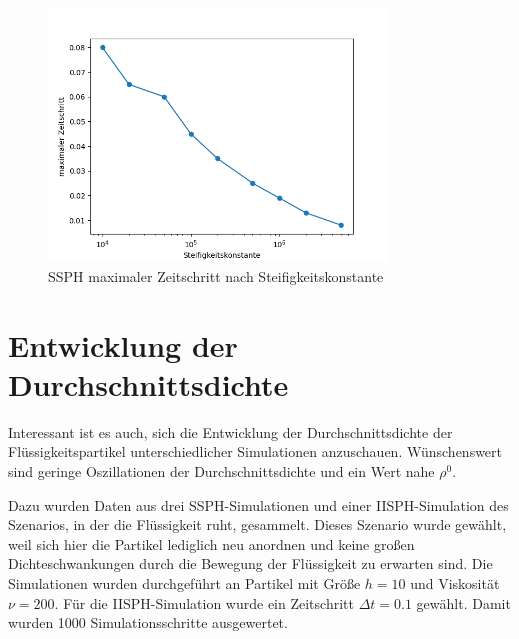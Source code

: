 \documentclass{scrreprt}
\begin{document}
\begin{figure}[htb]
    \includegraphics[width=0.8\textwidth]{stiffness_timestep_ssph.png}
    \caption{SSPH maximaler Zeitschritt nach Steifigkeitskonstante}
    \label{image:stiffness_timestep_ssph}
\end{figure}


\section{Entwicklung der Durchschnittsdichte}
Interessant ist es auch, sich die Entwicklung der Durchschnittsdichte der Flüssigkeitspartikel unterschiedlicher Simulationen anzuschauen.
Wünschenswert sind geringe Oszillationen der Durchschnittsdichte und ein Wert nahe $\rho^0$.

Dazu wurden Daten aus drei SSPH-Simulationen und einer IISPH-Simulation des Szenarios, in der die Flüssigkeit ruht, gesammelt.
Dieses Szenario wurde gewählt, weil sich hier die Partikel lediglich neu anordnen und keine großen Dichteschwankungen durch die Bewegung der Flüssigkeit zu erwarten sind.
Die Simulationen wurden durchgeführt an Partikel mit Größe $h=10$ und Viskosität $\nu = 200$.
Für die IISPH-Simulation wurde ein Zeitschritt $\Delta t = 0.1$ gewählt.
Damit wurden 1000 Simulationsschritte ausgewertet.
\end{document}
